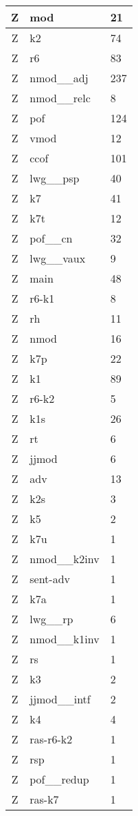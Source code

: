 \documentclass[a4 paper]{article}
\begin{document}
\begin{longtable}{cp{}p{}}
Z & mod & 21\\ \midrule Z & k2 & 74\\ \midrule Z & r6 & 83\\ \midrule Z & nmod\_\_adj & 237\\ \midrule Z & nmod\_\_relc & 8\\ \midrule Z & pof & 124\\ \midrule Z & vmod & 12\\ \midrule Z & ccof & 101\\ \midrule Z & lwg\_\_psp & 40\\ \midrule Z & k7 & 41\\ \midrule Z & k7t & 12\\ \midrule Z & pof\_\_cn & 32\\ \midrule Z & lwg\_\_vaux & 9\\ \midrule Z & main & 48\\ \midrule Z & r6-k1 & 8\\ \midrule Z & rh & 11\\ \midrule Z & nmod & 16\\ \midrule Z & k7p & 22\\ \midrule Z & k1 & 89\\ \midrule Z & r6-k2 & 5\\ \midrule Z & k1s & 26\\ \midrule Z & rt & 6\\ \midrule Z & jjmod & 6\\ \midrule Z & adv & 13\\ \midrule Z & k2s & 3\\ \midrule Z & k5 & 2\\ \midrule Z & k7u & 1\\ \midrule Z & nmod\_\_k2inv & 1\\ \midrule Z & sent-adv & 1\\ \midrule Z & k7a & 1\\ \midrule Z & lwg\_\_rp & 6\\ \midrule Z & nmod\_\_k1inv & 1\\ \midrule Z & rs & 1\\ \midrule Z & k3 & 2\\ \midrule Z & jjmod\_\_intf & 2\\ \midrule Z & k4 & 4\\ \midrule Z & ras-r6-k2 & 1\\ \midrule Z & rsp & 1\\ \midrule Z & pof\_\_redup & 1\\ \midrule Z & ras-k7 & 1\\ \midrule 

\end{longtable}
\end{document}
